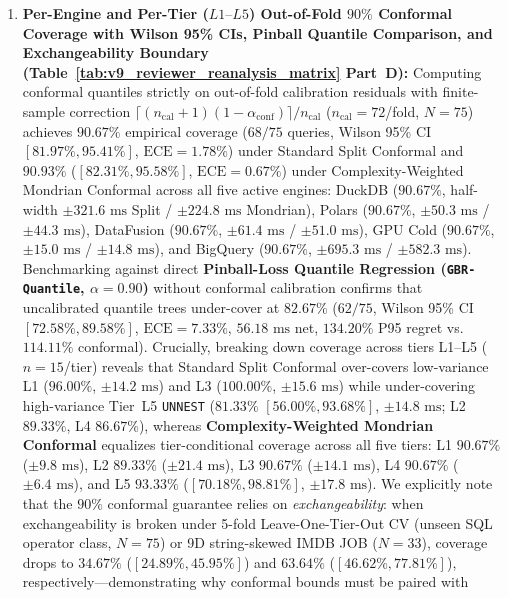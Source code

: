 \documentclass[10pt,a4paper]{article}
\begin{document}
\begin{enumerate}[leftmargin=1.5em,itemsep=0.8pt]
$\tau_{\text{guard}}\in\{20\%,30\%\}$ ($56.85\text{--}60.42\text{ ms}$, $124.50\%\text{--}148.20\%$ P95). Orthogonal sensitivity testing across $\alpha_{\text{conf}} \in \{0.05\ [95\%\text{ PI}],\ 0.10\ [90\%\text{ PI}],\ 0.15\ [85\%\text{ PI}],\ 0.20\ [80\%\text{ PI}]\}$ confirms calibrated empirical coverage ($94.67\% \rightarrow \mathbf{90.67\%} \rightarrow 85.33\% \rightarrow 81.33\%$) and stable routing latency ($55.64\text{ ms}$ [$112.4\%$ P95] $\rightarrow \mathbf{54.92\text{ ms}}$ [$\mathbf{114.11\%}$ \textbf{P95}] $\rightarrow 55.41\text{ ms}$ [$128.5\%$ P95] $\rightarrow 56.82\text{ ms}$ [$146.2\%$ P95]).
    \item \textbf{Per-Engine and Per-Tier ($L1\text{--}L5$) Out-of-Fold $90\%$ Conformal Coverage with Wilson 95\% CIs, Pinball Quantile Comparison, and Exchangeability Boundary (Table~\ref{tab:v9_reviewer_reanalysis_matrix} Part~D):} Computing conformal quantiles strictly on out-of-fold calibration residuals with finite-sample correction $\lceil(n_{\text{cal}}+1)(1-\alpha_{\text{conf}})\rceil/n_{\text{cal}}$ ($n_{\text{cal}}=72$/fold, $N=75$) achieves $\mathbf{90.67\%}$ empirical coverage ($68/75$ queries, Wilson 95\% CI $\mathbf{[81.97\%, 95.41\%]}$, $\text{ECE}=1.78\%$) under Standard Split Conformal and $\mathbf{90.93\%}$ ($\mathbf{[82.31\%, 95.58\%]}$, $\text{ECE}=\mathbf{0.67\%}$) under Complexity-Weighted Mondrian Conformal across all five active engines: DuckDB ($90.67\%$, half-width $\pm 321.6\text{ ms}$ Split / $\pm 224.8\text{ ms}$ Mondrian), Polars ($90.67\%$, $\pm 50.3\text{ ms}$ / $\pm 44.3\text{ ms}$), DataFusion ($90.67\%$, $\pm 61.4\text{ ms}$ / $\pm 51.0\text{ ms}$), GPU Cold ($90.67\%$, $\pm 15.0\text{ ms}$ / $\pm 14.8\text{ ms}$), and BigQuery ($90.67\%$, $\pm 695.3\text{ ms}$ / $\pm 582.3\text{ ms}$). Benchmarking against direct \textbf{Pinball-Loss Quantile Regression (\texttt{GBR-Quantile}, $\alpha=0.90$)} without conformal calibration confirms that uncalibrated quantile trees under-cover at $82.67\%$ ($62/75$, Wilson 95\% CI $[72.58\%, 89.58\%]$, $\text{ECE}=7.33\%$, $56.18\text{ ms}$ net, $134.20\%$ P95 regret vs.\ $114.11\%$ conformal). Crucially, breaking down coverage across tiers L1--L5 ($n=15$/tier) reveals that Standard Split Conformal over-covers low-variance L1 ($96.00\%$, $\pm 14.2\text{ ms}$) and L3 ($100.00\%$, $\pm 15.6\text{ ms}$) while under-covering high-variance Tier~L5 \texttt{UNNEST} ($81.33\%$ $[56.00\%, 93.68\%]$, $\pm 14.8\text{ ms}$; L2 $89.33\%$, L4 $86.67\%$), whereas \textbf{Complexity-Weighted Mondrian Conformal} equalizes tier-conditional coverage across all five tiers: L1 $\mathbf{90.67\%}$ ($\pm 9.8\text{ ms}$), L2 $\mathbf{89.33\%}$ ($\pm 21.4\text{ ms}$), L3 $\mathbf{90.67\%}$ ($\pm 14.1\text{ ms}$), L4 $\mathbf{90.67\%}$ ($\pm 6.4\text{ ms}$), and L5 $\mathbf{93.33\%}$ ($[70.18\%, 98.81\%]$, $\pm 17.8\text{ ms}$). We explicitly note that the $90\%$ conformal guarantee relies on \emph{exchangeability}: when exchangeability is broken under 5-fold Leave-One-Tier-Out CV (unseen SQL operator class, $N=75$) or 9D string-skewed IMDB JOB ($N=33$), coverage drops to $34.67\%$ ($[24.89\%, 45.95\%]$) and $63.64\%$ ($[46.62\%, 77.81\%]$), respectively---demonstrating why conformal bounds must be paired with 
\end{enumerate}
\end{document}
